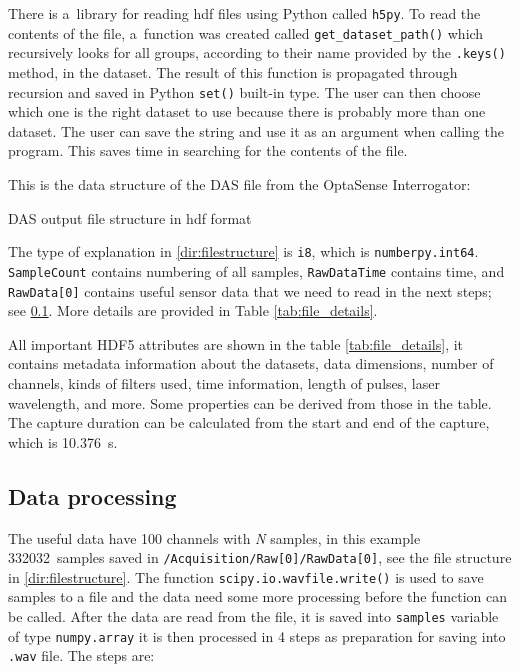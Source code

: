 There is a~library for reading \ac{hdf} files using Python called \verb|h5py|. To read the contents of the file, a~function was created called \verb|get_dataset_path()| which recursively looks for all groups, according to their name provided by the \verb|.keys()| method, in the dataset. The result of this function is propagated through recursion and saved in Python \verb|set()| built-in type. The user can then choose which one is the right dataset to use because there is probably more than one dataset. The user can save the string and use it as an argument when calling the program. This saves time in searching for the contents of the file. 

This is the data structure of the DAS file from the OptaSense Interrogator:

\bigskip
DAS output file structure in \ac{hdf} format
{\small
%
\label{dir:filestructure}
}
\bigskip

The type of explanation in \ref{dir:filestructure} is \verb|i8|, which is \verb|numberpy.int64|. \verb|SampleCount| contains numbering of all samples, \verb|RawDataTime| contains time, and \verb|RawData[0]| contains useful sensor data that we need to read in the next steps; see \ref{sec:data_processing}. More details are provided in Table \ref{tab:file_details}.

All important HDF5 attributes are shown in the table \ref{tab:file_details}, it contains metadata information about the datasets, data dimensions, number of channels, kinds of filters used, time information, length of pulses, laser wavelength, and more. Some properties can be derived from those in the table. The capture duration can be calculated from the start and end of the capture, which is \qty{10,376}{\second}.

\subsection{Data processing} \label{sec:data_processing}

The useful data have 100 channels with \textit{N} samples, in this example \qty{332032}{samples} saved in \verb|/Acquisition/Raw[0]/RawData[0]|, see the file structure in \ref{dir:filestructure}. The function \verb|scipy.io.wavfile.write()| is used to save samples to a file and the data need some more processing before the function can be called. After the data are read from the file, it is saved into \verb|samples| variable of type \verb|numpy.array| it is then processed in 4 steps as preparation for saving into \verb|.wav| file. The steps are:

